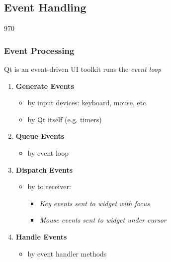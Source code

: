 %
%
%
%

\subsection{Event Handling}

\begin{slide}{970}
\frametitle{Event Processing}
\label{events_introduction}

\begin{block}{Qt is an event-driven UI toolkit}
 runs the \textit{event loop}
\end{block}
\begin{enumerate}
\item \textbf{Generate Events}
  \begin{itemize}
  \item by input devices: keyboard, mouse, etc.
  \item by Qt itself (e.g. timers)
  \end{itemize}
\item \textbf{Queue Events}
  \begin{itemize}
  \item by event loop
  \end{itemize}
\item \textbf{Dispatch Events}
  \begin{itemize}
  \item by  to receiver: 
    \begin{itemize}
    \item \textit{Key events sent to widget with focus}
    \item \textit{Mouse events sent to widget under cursor}
    \end{itemize}
 \end{itemize}
\item \textbf{Handle Events}
  \begin{itemize}
  \item by  event handler methods
  \end{itemize}
\end{enumerate}
\end{slide}

